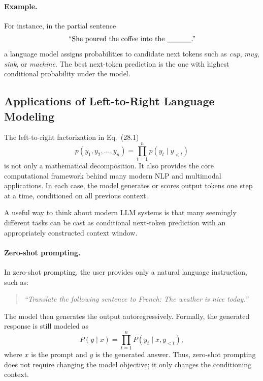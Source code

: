 \documentclass{article}
\begin{document}
\paragraph{Example.}
For instance, in the partial sentence
\[
\text{``She poured the coffee into the \underline{\hspace{1.2cm}}.''}
\]
a language model assigns probabilities to candidate next tokens such as \emph{cup}, \emph{mug}, \emph{sink}, or \emph{machine}. The best next-token prediction is the one with highest conditional probability under the model.

\subsection{Applications of Left-to-Right Language Modeling}

The left-to-right factorization in Eq.~(28.1)
\[
p(y_1,y_2,\dots,y_n)=\prod_{t=1}^{n} p(y_t\mid y_{<t})
\]
is not only a mathematical decomposition. It also provides the core computational framework behind many modern NLP and multimodal applications. In each case, the model generates or scores output tokens one step at a time, conditioned on all previous context.

A useful way to think about modern LLM systems is that many seemingly different tasks can be cast as conditional next-token prediction with an appropriately constructed context window.

\paragraph{Zero-shot prompting.}
In zero-shot prompting, the user provides only a natural language instruction, such as:
\begin{quote}
\textit{“Translate the following sentence to French: The weather is nice today.”}
\end{quote}
The model then generates the output autoregressively. Formally, the generated response is still modeled as
\[
P(y \mid x) = \prod_{t=1}^{n} P(y_t \mid x, y_{<t}),
\]
where $x$ is the prompt and $y$ is the generated answer. Thus, zero-shot prompting does not require changing the model objective; it only changes the conditioning context.
\end{document}
